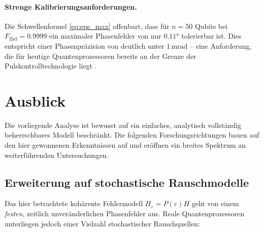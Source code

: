 ﻿\documentclass[11pt,a4paper]{article}
\theoremstyle{definition}
\newcommand{\eps}{\varepsilon}
\newcommand{\Heps}{H_{\!\varepsilon}}
\begin{document}
\paragraph{Strenge Kalibrierungsanforderungen.}
Die Schwellenformel \eqref{eq:eps_max} offenbart, dass für $n=50$ Qubits
bei $F_{\mathrm{Ziel}}=0.9999$ ein maximaler Phasenfehler von nur $0.11 °$
tolerierbar ist.  Dies entspricht einer Phasenpräzision von deutlich unter
$1\,\mathrm{mrad}$ -- eine Anforderung, die für heutige Quantenprozessoren
bereits an der Grenze der Pulskontrolltechnologie liegt \cite{Rol2019}.

\section{Ausblick}
\label{sec:outlook}

Die vorliegende Analyse ist bewusst auf ein einfaches, analytisch vollständig
beherrschbares Modell beschränkt.  Die folgenden Forschungsrichtungen bauen
auf den hier gewonnenen Erkenntnissen auf und eröffnen ein breites Spektrum
an weiterführenden Untersuchungen.

\subsection{Erweiterung auf stochastische Rauschmodelle}
\label{subsec:stochastic}

Das hier betrachtete kohärente Fehlermodell $\Heps = P(\eps)H$ geht von einem
\emph{festen}, zeitlich unveränderlichen Phasenfehler aus.  Reale Quantenprozessoren
unterliegen jedoch einer Vielzahl stochastischer Rauschquellen:
\end{document}
